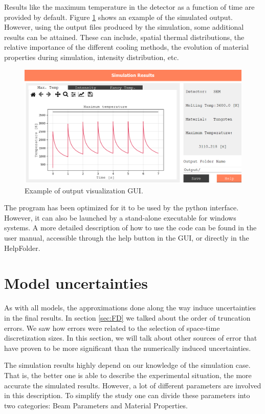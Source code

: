 Results like the maximum temperature in the detector as a function of time are provided by default. Figure \ref{fig:GUIResults} shows an example of the simulated output. However, using the output files produced by the simulation, some additional results can be attained. These can include, spatial thermal distributions, the relative importance of the different cooling methods, the evolution of material properties during simulation, intensity distribution, etc. 

\begin{figure}[h]
    \centering
    \includegraphics[width=0.9\columnwidth]{PyTT_GUI/PyTTresults.png}
    \caption{Example of output visualization GUI.}
    \label{fig:GUIResults}
\end{figure}

The program has been optimized for it to be used by the python interface. However, it can also be launched by a stand-alone executable for windows systems. A more detailed description of how to use the code can be found in the user manual, accessible through the help button in the GUI, or directly in the HelpFolder.

\section{Model uncertainties}
\label{sec:ModelUnc}

As with all models, the approximations done along the way induce uncertainties in the final results. In section \ref{sec:FD} we talked about the order of truncation errors. We saw how errors were related to the selection of space-time discretization sizes. In this section, we will talk about other sources of error that have proven to be more significant than the numerically induced uncertainties. 

The simulation results highly depend on our knowledge of the simulation case. That is, the better one is able to describe the experimental situation, the more accurate the simulated results. However, a lot of different parameters are involved in this description. To simplify the study one can divide these parameters into two categories: Beam Parameters and Material Properties. 

